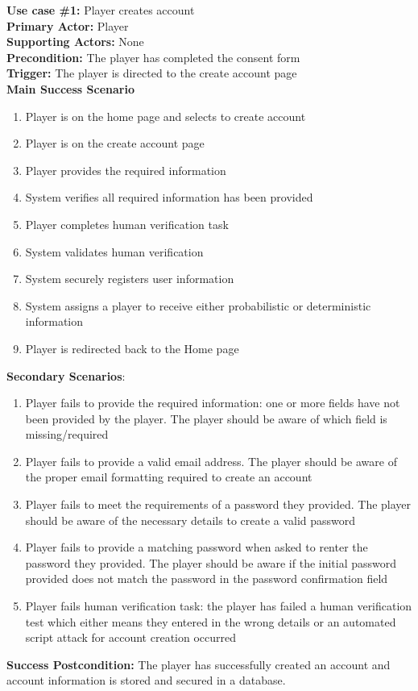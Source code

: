 \documentclass{article}
\begin{document}
\textbf{Use case \#1:} Player creates account\\
\textbf{Primary Actor:} Player\\
\textbf{Supporting Actors:} None\\
\textbf{Precondition:} The player has completed the consent form\\
\textbf{Trigger:} The player is directed to the create account page\\
\textbf{Main Success Scenario}
\begin{enumerate}
    \item Player is on the home page and selects to create account
    \item Player is on the create account page
    \item Player provides the required information
    \item System verifies all required information has been provided
    \item Player completes human verification task
    \item System validates human verification
    \item System securely registers user information
    \item System assigns a player to receive either probabilistic or deterministic information
    \item Player is redirected back to the Home page
\end{enumerate}
\textbf{Secondary Scenarios}:
\begin{enumerate}
    \item Player fails to provide the required information: one or more fields have not been provided by the player. The player should be aware of which field is missing/required
    \item Player fails to provide a valid email address. The player should be aware of the proper email formatting required to create an account
    \item Player fails to meet the requirements of a password they provided. The player should be aware of the necessary details to create a valid password
    \item Player fails to provide a matching password when asked to renter the password they provided. The player should be aware if the initial password provided does not match the password in the password confirmation field
    \item Player fails human verification task: the player has failed a human verification test which either means they entered in the wrong details or an automated script attack for account creation occurred

\end{enumerate}
\textbf{Success Postcondition:} The player has successfully created an account and account information is stored and secured in a database.
\end{document}
